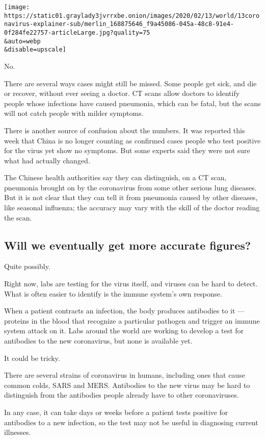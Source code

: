 \texttt{[image: https://static01.graylady3jvrrxbe.onion/images/2020/02/13/world/13coronavirus-explainer-sub/merlin\_168875646\_f9a45086-045a-48c8-91e4-0f284fe22757-articleLarge.jpg?quality=75\\\&auto=webp\\\&disable=upscale]}

No.

There are several ways cases might still be missed. Some people get
sick, and die or recover, without ever seeing a doctor. CT scans allow
doctors to identify people whose infections have caused pneumonia, which
can be fatal, but the scans will not catch people with milder symptoms.

There is another source of confusion about the numbers. It was reported
this week that China is no longer counting as confirmed cases people who
test positive for the virus yet show no symptoms. But some experts said
they were not sure what had actually changed.

The Chinese health authorities say they can distinguish, on a CT scan,
pneumonia brought on by the coronavirus from some other serious lung
diseases. But it is not clear that they can tell it from pneumonia
caused by other diseases, like seasonal influenza; the accuracy may vary
with the skill of the doctor reading the scan.

\hypertarget{will-we-eventually-get-more-accurate-figures}{%
\subsection{Will we eventually get more accurate
figures?}\label{will-we-eventually-get-more-accurate-figures}}

Quite possibly.

Right now, labs are testing for the virus itself, and viruses can be
hard to detect. What is often easier to identify is the immune system's
own response.

When a patient contracts an infection, the body produces antibodies to
it --- proteins in the blood that recognize a particular pathogen and
trigger an immune system attack on it. Labs around the world are working
to develop a test for antibodies to the new coronavirus, but none is
available yet.

It could be tricky.

There are several strains of coronavirus in humans, including ones that
cause common colds, SARS and MERS. Antibodies to the new virus may be
hard to distinguish from the antibodies people already have to other
coronaviruses.

In any case, it can take days or weeks before a patient tests positive
for antibodies to a new infection, so the test may not be useful in
diagnosing current illnesses.

